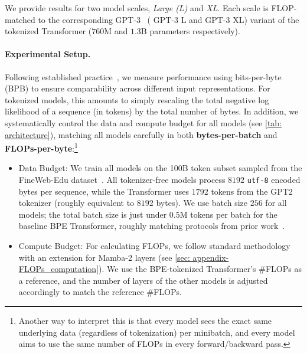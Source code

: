 We provide results for two model scales, \emph{Large (L)} and \emph{XL}.
Each scale is FLOP-matched to the corresponding GPT-3~\citep{GPT3} (\ie{} GPT-3 L and GPT-3 XL) variant of the tokenized Transformer ($760$M and $1.3$B parameters respectively).

\paragraph{Experimental Setup.}

Following established practice~\citep{ByT5, MambaByte, SpaceByte}, we measure performance using bits-per-byte (BPB) to ensure comparability across different input representations.
For tokenized models, this amounts to simply rescaling the total negative log likelihood of a sequence (in tokens) by the total number of bytes.
In addition, we systematically control the data and compute budget for all models (see \cref{tab: architecture}),
matching all models carefully in both \textbf{bytes-per-batch} and \textbf{FLOPs-per-byte}:\footnote{Another way to interpret this is that every model sees the exact same underlying data (regardless of tokenization) per minibatch, and every model aims to use the same number of FLOPs in every forward/backward pass.}
\begin{itemize}

    \item Data Budget: We train all models on the 100B token subset sampled from the FineWeb-Edu dataset~\citep{FineWeb-Edu}.
    All tokenizer-free models process $8192$ \texttt{utf-8} encoded bytes per sequence, while the Transformer uses $1792$ tokens from the GPT2 tokenizer (roughly equivalent to $8192$ bytes).
    We use batch size $256$ for all models; the total batch size is just under $0.5$M tokens per batch for the baseline BPE Transformer, roughly matching protocols from prior work~\citep{Mamba}.
    
    \item Compute Budget: For calculating FLOPs, we follow standard methodology~\citep{Chinchilla} with an extension for Mamba-2 layers (see \cref{sec: appendix-FLOPs_computation}).
    We use the BPE-tokenized Transformer's \#FLOPs as a reference, and the number of layers of the other models is adjusted accordingly to match the reference \#FLOPs.
\end{itemize}

